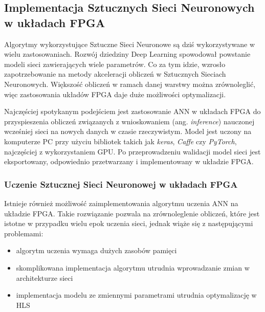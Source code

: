 \subsection{Implementacja Sztucznych Sieci Neuronowych w układach FPGA}

Algorytmy wykorzystujące Sztuczne Sieci Neuronowe są dziś wykorzystywane w wielu zastosowaniach. Rozwój dziedziny Deep 
Learning spowodował powstanie modeli sieci zawierających wiele parametrów. Co za tym idzie, wzrosło zapotrzebowanie na metody 
akceleracji obliczeń w Sztucznych Sieciach Neuronowych. Większość obliczeń w ramach danej warstwy można zrównoleglić, więc 
zastosowania układów FPGA daje duże możliwości optymalizacji.

Najczęściej spotykanym podejściem jest zastosowanie ANN w układach FPGA do przyspieszenia obliczeń związanych z wnioskowaniem (ang. \emph{inference}) nauczonej 
wcześniej sieci na nowych danych w czasie rzeczywistym. Model jest uczony na komputerze PC przy użyciu bibliotek takich jak 
\emph{keras}, \emph{Caffe} czy \emph{PyTorch}, najczęściej z wykorzystaniem GPU. Po przeprowadzeniu walidacji model sieci jest eksportowany, odpowiednio przetwarzany i implementowany w układzie FPGA. 



\subsubsection{Uczenie Sztucznej Sieci Neuronowej w układach FPGA}

Istnieje również możliwość zaimplementowania algorytmu uczenia ANN na układzie FPGA. Takie rozwiązanie pozwala na zrównoleglenie obliczeń, które jest istotne w przypadku wielu epok uczenia sieci, jednak wiąże się z następującymi problemami:
\begin{itemize}
    \item algorytm uczenia wymaga dużych zasobów pamięci
    \item skomplikowana implementacja algorytmu utrudnia wprowadzanie zmian w architekturze sieci
    \item implementacja modelu ze zmiennymi parametrami utrudnia optymalizację w HLS
\end{itemize}




